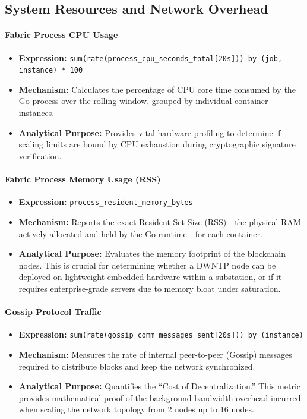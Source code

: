 \subsection{System Resources and Network Overhead}

\paragraph{Fabric Process CPU Usage}
\begin{itemize}
    \item \textbf{Expression:} \verb|sum(rate(process_cpu_seconds_total[20s])) by (job, instance) * 100|
    \item \textbf{Mechanism:} Calculates the percentage of CPU core time consumed by the Go process over the rolling window, grouped by individual container instances.
    \item \textbf{Analytical Purpose:} Provides vital hardware profiling to determine if scaling limits are bound by CPU exhaustion during cryptographic signature verification.
\end{itemize}

\paragraph{Fabric Process Memory Usage (RSS)}
\begin{itemize}
    \item \textbf{Expression:} \verb|process_resident_memory_bytes|
    \item \textbf{Mechanism:} Reports the exact Resident Set Size (RSS)—the physical RAM actively allocated and held by the Go runtime—for each container.
    \item \textbf{Analytical Purpose:} Evaluates the memory footprint of the blockchain nodes. This is crucial for determining whether a DWNTP node can be deployed on lightweight embedded hardware within a substation, or if it requires enterprise-grade servers due to memory bloat under saturation.
\end{itemize}

\paragraph{Gossip Protocol Traffic}
\begin{itemize}
    \item \textbf{Expression:} \verb|sum(rate(gossip_comm_messages_sent[20s])) by (instance)|
    \item \textbf{Mechanism:} Measures the rate of internal peer-to-peer (Gossip) messages required to distribute blocks and keep the network synchronized.
    \item \textbf{Analytical Purpose:} Quantifies the ``Cost of Decentralization.'' This metric provides mathematical proof of the background bandwidth overhead incurred when scaling the network topology from 2 nodes up to 16 nodes.
\end{itemize}
